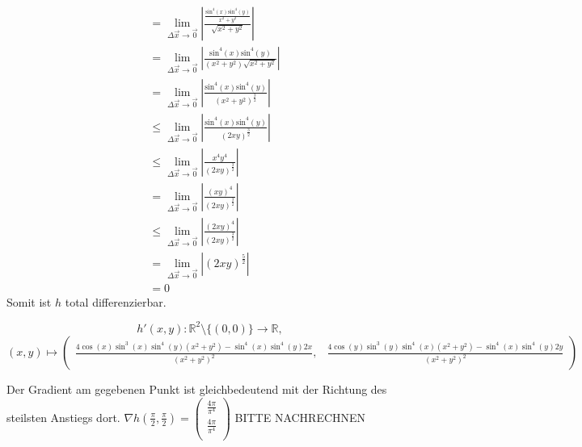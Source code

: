 \documentclass[10pt,a4paper,parskip=half]{scrartcl}
\newcommand{\vectwo}[2]{\left(\begin {array} {c}#1\\#2\\\end {array} \right)}
\begin{document}
\begin{enumerate}[(i)]
\begin{align*}
&= \lim_{\Delta \vec x \to \vec 0} \left|\frac{\frac{\text{sin}^4(x)\text{sin}^4(y)}{x^2 + y^2}}{\sqrt{x^2+y^2}}\right| \\
&= \lim_{\Delta \vec x \to \vec 0} \left|\frac{\text{sin}^4(x)\text{sin}^4(y)}{(x^2 + y^2)\sqrt{x^2+y^2}}\right| \\
&= \lim_{\Delta \vec x \to \vec 0} \left|\frac{\text{sin}^4(x)\text{sin}^4(y)}{(x^2 + y^2)^{\frac{3}{2}}}\right| \\
&\le \lim_{\Delta \vec x \to \vec 0} \left|\frac{\text{sin}^4(x)\text{sin}^4(y)}{(2xy)^{\frac{3}{2}}}\right| \\
&\le \lim_{\Delta \vec x \to \vec 0} \left|\frac{x^4y^4}{(2xy)^{\frac{3}{2}}}\right| \\
&= \lim_{\Delta \vec x \to \vec 0} \left|\frac{(xy)^4}{(2xy)^{\frac{3}{2}}}\right| \\
&\le \lim_{\Delta \vec x \to \vec 0} \left|\frac{(2xy)^4}{(2xy)^{\frac{3}{2}}}\right| \\
&= \lim_{\Delta \vec x \to \vec 0} \left|(2xy)^{\frac{5}{2}}\right| \\
&= 0
\end{align*}
Somit ist $h$ total differenzierbar.

\[
h'(x,y): \mathbb{R}^2\setminus{\{(0,0)\}} \to \mathbb{R}, 
\]
\[
(x,y) \mapsto \left( \begin{array}{cc} 
\frac{4\cos(x)\sin^3(x)\sin^4(y)(x^2 + y^2) - \sin^4(x)\sin^4(y)2x}{(x^2 + y^2)^2}, &
\frac{4\cos(y)\sin^3(y)\sin^4(x)(x^2 + y^2) - \sin^4(x)\sin^4(y)2y}{(x^2 + y^2)^2}
\end{array}\right)
\]

Der Gradient am gegebenen Punkt ist gleichbedeutend mit der Richtung des steilsten Anstiegs dort. \(\nabla h(\frac{\pi}{2},\frac{\pi}{2}) = \vectwo{\frac{4\pi}{\pi^4}}{\frac{4\pi}{\pi^4}}\) BITTE NACHRECHNEN


\end{enumerate}
\end{document}

